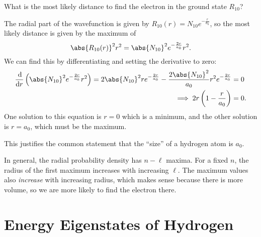\documentclass[../quantum_mechanics.tex]{subfiles}
\begin{document}
            \begin{example}
                What is the most likely distance to find the electron in the ground state $R_{10}$?

                The radial part of the wavefunction is given by $R_{10}(r)=N_{10}e^{-\frac{r}{a_0}}$, so the most likely distance is given by the maximum of
                \begin{equation}
                    \abs{R_{10}(r)}^2r^2=\abs{N_{10}}^2e^{-\frac{2r}{a_0}}r^2.
                \end{equation}
                We can find this by differentiating and setting the derivative to zero:
                \begin{align}
                    \dv{}{r}\left(\abs{N_{10}}^2e^{-\frac{2r}{a_0}}r^2\right)=2\abs{N_{10}}^2re^{-\frac{2r}{a_0}}-\frac{2\abs{N_{10}}^2}{a_0}r^2e^{-\frac{2r}{a_0}}&=0\\
                    \implies 2r\left(1-\frac{r}{a_0}\right)&=0.
                \end{align}
                One solution to this equation is $r=0$ which is a minimum, and the other solution is $r=a_0$, which must be the maximum.

                This justifies the common statement that the ``size'' of a hydrogen atom is $a_0$.
            \end{example}

            In general, the radial probability density has $n-\ell$ maxima.
            For a fixed $n$, the radius of the first maximum increases with increasing $\ell$.
            The maximum values also \textit{increase} with increasing radius, which makes sense because there is more volume, so we are more likely to find the electron there.

    \section{Energy Eigenstates of Hydrogen}\label{chap:the-hydrogen-atom:sec:energy-eigenstates}
\end{document}
